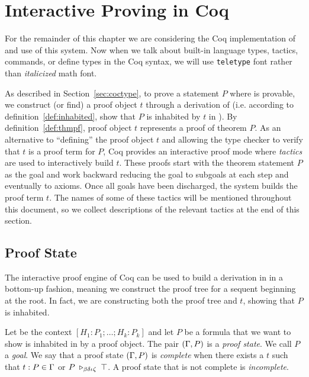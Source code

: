 \section{Interactive Proving in Coq}
\label{sec:coqpf}

For the remainder of this chapter we are considering the Coq implementation of \cic{} and use of this system. Now when we talk about built-in language types, tactics, commands, or define types in the Coq syntax, we will use \texttt{teletype} font rather than \textit{italicized} math font.

As described in Section~\ref{sec:coctype}, to prove a statement $P$ where  is provable, we construct (or find) a proof object $t$ through a derivation of  (i.e. according to definition~\ref{def:inhabited}, show that $P$ is inhabited by $t$ in \dyncon{}). By definition~\ref{def:thmpf}, proof object $t$ represents a proof of theorem $P$. As an alternative to ``defining'' the proof object $t$ and allowing the type checker to verify that $t$ is a proof term for $P$, Coq provides an interactive proof mode where \emph{tactics} are used to interactively build $t$. These proofs start with the theorem statement $P$ as the goal and work backward reducing the goal to subgoals at each step and eventually to axioms. Once all goals have been discharged, the system builds the proof term $t$. The names of some of these tactics will be mentioned throughout this document, so we collect descriptions of the relevant tactics at the end of this section.

\subsection{Proof State}
\label{subsec:pfstate}
The interactive proof engine of Coq can be used to build a derivation in \coc{} in a bottom-up fashion, meaning we construct the proof tree for a sequent  beginning at the root. In fact, we are constructing both the proof tree and $t$, showing that $P$ is inhabited.

\begin{defnc}
Let \dyncon{} be the context $[ H_1 : P_1 ; \ldots ; H_k : P_k]$ and let $P$ be a formula that we want to show is inhabited in \dyncon{} by a proof object. The pair $(\Gamma{} , P)$ is a \emph{proof state}. We call $P$ a \emph{goal}. We say that a proof state $(\Gamma{}, P)$ is \emph{complete} when there exists a $t$ such that $t : P \in \Gamma{}$ or $P \; \triangleright_{\beta\delta\iota\zeta} \;{} \top$. A proof state that is not complete is \emph{incomplete}.
\end{defnc}

